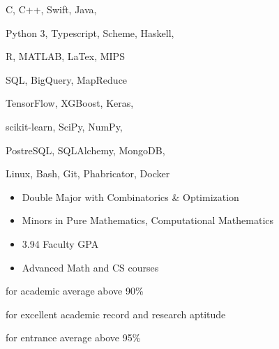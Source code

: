 C, C++, Swift, Java,
\smallskip

Python 3, Typescript, Scheme, Haskell,
\smallskip

R, MATLAB, LaTex, MIPS

\divider\smallskip

SQL, BigQuery, MapReduce
\smallskip

TensorFlow, XGBoost, Keras,
\smallskip

scikit-learn, SciPy, NumPy,
\smallskip

PostreSQL, SQLAlchemy, MongoDB,

\divider\smallskip

Linux, Bash, Git, Phabricator, Docker


\begin{itemize}
    \item Double Major with Combinatorics \& Optimization
    \item Minors in Pure Mathematics, Computational Mathematics
    \item 3.94 Faculty GPA
    \item Advanced Math and CS courses
\end{itemize}


for academic average above 90\%

\divider\smallskip

for excellent academic record and research aptitude

\divider\smallskip


\divider\smallskip

for entrance average above 95\%

